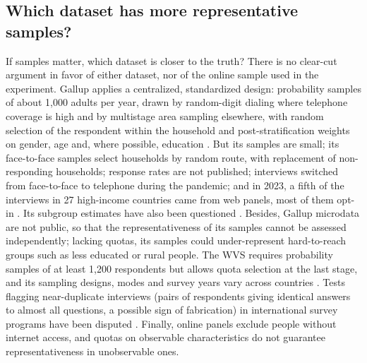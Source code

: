 \documentclass[12pt]{article}
\begin{document}
\subsection{Which dataset has more representative samples?}\label{subsec:data_quality}

If samples matter, which dataset is closer to the truth? There is no clear-cut argument in favor of either dataset, nor of the online sample used in the experiment. Gallup applies a centralized, standardized design: probability samples of about 1,000 adults per year, drawn by random-digit dialing where telephone coverage is high and by multistage area sampling elsewhere, with random selection of the respondent within the household and post-stratification weights on gender, age and, where possible, education \citep{gallup_methodology_2023}. But its samples are small; its face-to-face samples select households by random route, with replacement of non-responding households; response rates are not published; interviews switched from face-to-face to telephone during the pandemic; and in 2023, a fifth of the interviews in 27 high-income countries came from web panels, most of them opt-in \citep{gallup_methodology_2023}. Its subgroup estimates have also been questioned \citep{blanchflower_gallup_2024}. Besides, Gallup microdata are not public, so that the representativeness of its samples cannot be assessed independently; lacking quotas, its samples could under-represent hard-to-reach groups such as less educated or rural people. The WVS requires probability samples of at least 1,200 respondents but allows quota selection at the last stage, and its sampling designs, modes and survey years vary across countries \citep{wvs_rules_wave8}. Tests flagging near-duplicate interviews (pairs of respondents giving identical answers to almost all questions, a possible sign of fabrication) in international survey programs \citep{kuriakose_dont_2016} have been disputed \citep{pew_data_2016}. Finally, online panels exclude people without internet access, and quotas on observable characteristics do not guarantee representativeness in unobservable ones.
\end{document}
